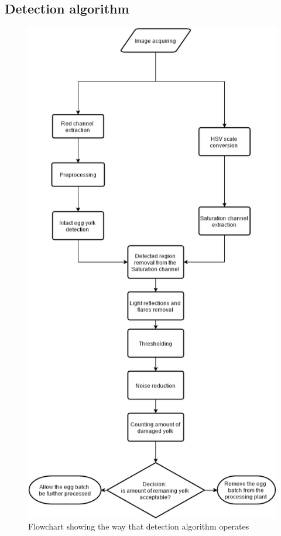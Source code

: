 \documentclass[12pt,twoside,a4paper]{article}
\begin{document}
\subsection{Detection algorithm}
\begin{figure}[H]
\centering
\includegraphics[width=0.5\paperwidth]{algorithmV}
\caption{Flowchart showing the way that detection algorithm operates}\label{fig:algorithmV}
\end{figure}
\newpage
\end{document}
